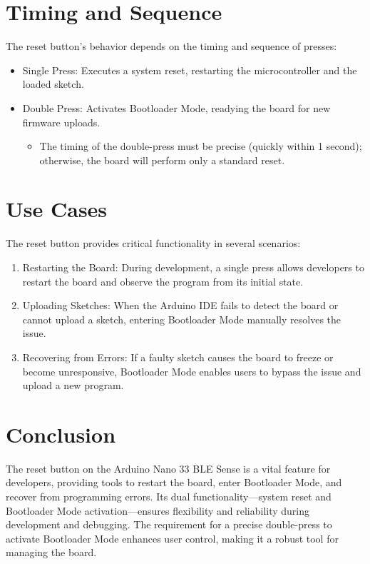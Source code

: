 \section{Timing and Sequence} 

The reset button’s behavior depends on the timing and sequence of presses:

\begin{itemize}
	\item Single Press: Executes a system reset, restarting the microcontroller and the loaded sketch.
	
	\item Double Press: Activates Bootloader Mode, readying the board for new firmware uploads.
	
	\begin{itemize}
		\item The timing of the double-press must be precise (quickly within 1 second); otherwise, the board will perform only a standard reset.
	\end{itemize}
	
\end{itemize}





\section{Use Cases}

The reset button provides critical functionality in several scenarios:


\begin{enumerate}
	\item Restarting the Board: During development, a single press allows developers to restart the board and observe the program from its initial state.
	
	\item  Uploading Sketches: When the Arduino IDE fails to detect the board or cannot upload a sketch, entering Bootloader Mode manually resolves the issue.
	
	\item Recovering from Errors: If a faulty sketch causes the board to freeze or become unresponsive, Bootloader Mode enables users to bypass the issue and upload a new program.
	
\end{enumerate}



\section{Conclusion}

The reset button on the Arduino Nano 33 BLE Sense is a vital feature for developers, providing tools to restart the board, enter Bootloader Mode, and recover from programming errors. Its dual functionality—system reset and Bootloader Mode activation—ensures flexibility and reliability during development and debugging. The requirement for a precise double-press to activate Bootloader Mode enhances user control, making it a robust tool for managing the board.
